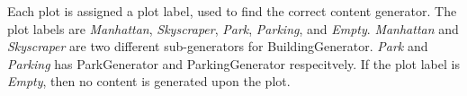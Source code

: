 Each plot is assigned a plot label, used to find the correct content generator.
The plot labels are \textit{Manhattan}, \textit{Skyscraper}, \textit{Park}, \textit{Parking}, and \textit{Empty}.
\textit{Manhattan} and \textit{Skyscraper} are two different sub-generators for BuildingGenerator. 
\textit{Park} and \textit{Parking} has ParkGenerator and ParkingGenerator respecitvely.
If the plot label is \textit{Empty}, then no content is generated upon the plot. 